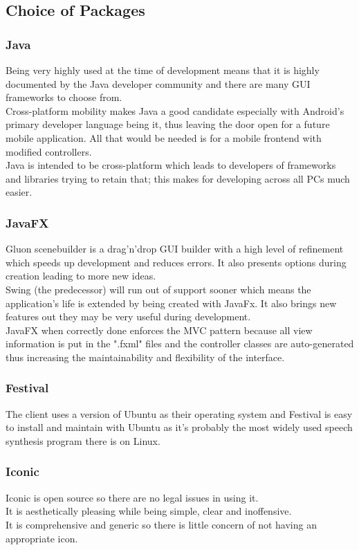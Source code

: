 \documentclass[conference]{IEEEtran}
\begin{document}
	\subsection{Choice of Packages}
	\subsubsection{Java}
	Being very highly used at the time of development means that it is highly documented by the Java developer community and there are many GUI frameworks to choose from.\\
	Cross-platform mobility makes Java a good candidate especially with Android's primary developer language being it, thus leaving the door open for a future mobile application. All that would be needed is for a mobile frontend with modified controllers.\\
	Java is intended to be cross-platform which leads to developers of frameworks and libraries trying to retain that; this makes for developing across all PCs much easier.
	\subsubsection{JavaFX}
	Gluon scenebuilder is a drag'n'drop GUI builder with a high level of refinement which speeds up development and reduces errors. It also presents options during creation leading to more new ideas.\\
	Swing (the predecessor) will run out of support sooner which means the application's life is extended by being created with JavaFx. It also brings new features out they may be very useful during development.\\
	JavaFX when correctly done enforces the MVC pattern because all view information is put in the ".fxml" files and the controller classes are auto-generated thus increasing the maintainability and flexibility of the interface.
	\subsubsection{Festival}
	The client uses a version of Ubuntu as their operating system and Festival is easy to install and maintain with Ubuntu as it's probably the most widely used speech synthesis program there is on Linux.\\
	\subsubsection{Iconic}
	Iconic is open source so there are no legal issues in using it.\\
	It is aesthetically pleasing while being simple, clear and inoffensive.\\
	It is comprehensive and generic so there is little concern of not having an appropriate icon.\\
\end{document}
